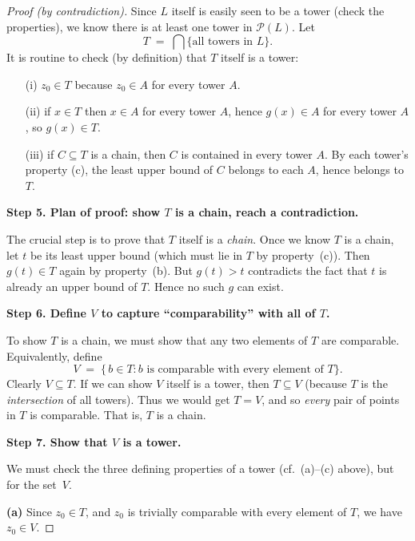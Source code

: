 \documentclass[12pt]{article}
\theoremstyle{definition} %
\theoremstyle{plain} %
\begin{document}
\begin{proof}[Proof (by contradiction)]
    Since $L$ itself is easily seen to be a tower (check the properties),
    we know there is at least one tower in $\mathcal{P}(L)$.  Let
    \[
       T \;=\; \bigcap \{\text{all towers in $L$}\}.
    \]
    It is routine to check (by definition) that $T$ itself is a tower:
    \begin{itemize}
    \item[(i)] $z_0 \in T$ because $z_0 \in A$ for every tower $A$.
    \item[(ii)] if $x \in T$ then $x \in A$ for every tower $A$, hence 
       $g(x) \in A$ for every tower $A$, so $g(x) \in T$. 
    \item[(iii)] if $C \subseteq T$ is a chain, then $C$ is contained in 
       every tower $A$.  By each tower's property (c), the least upper bound 
       of $C$ belongs to each $A$, hence belongs to $T$.
    \end{itemize}
    
    \medskip
    
    \textbf{Step 5. Plan of proof: show $T$ is a chain, reach a contradiction.}
    
    The crucial step is to prove that $T$ itself is a \emph{chain}.  Once we 
    know $T$ is a chain, let $t$ be its least upper bound (which must lie 
    in $T$ by property~(c)).  Then $g(t) \in T$ again by property~(b).  
    But $g(t) > t$ contradicts the fact that $t$ is already an upper bound 
    of $T$.  Hence no such $g$ can exist.
    
    \medskip
    
    \textbf{Step 6. Define $V$ to capture ``comparability'' with all of $T$.}
    
    To show $T$ is a chain, we must show that any two elements of $T$ 
    are comparable.  Equivalently, define
    \[
       V \;=\; \{\,b \in T : b \text{ is comparable with every element of } T\}.
    \]
    Clearly $V \subseteq T$.  If we can show $V$ itself is a tower, 
    then $T \subseteq V$ (because $T$ is the \emph{intersection} of 
    all towers).  Thus we would get $T = V$, and so \emph{every} 
    pair of points in $T$ is comparable.  That is, $T$ is a chain.
    
    \medskip
    
    \textbf{Step 7. Show that $V$ is a tower.}
    
    We must check the three defining properties of a tower 
    (cf.\ (a)--(c) above), but for the set~$V$.
    
    \textbf{(a)} Since $z_0 \in T$, and $z_0$ is trivially comparable 
    with every element of $T$, we have $z_0 \in V$.
    

\end{proof}
\end{document}
